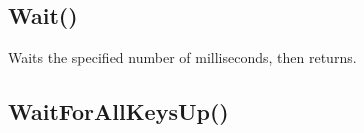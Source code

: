 \documentclass[letterpaper,10pt,english]{sphinxmanual}
\begin{document}
\sphinxAtStartPar
{}

\begin{sphinxVerbatim}[commandchars=\\\{\}]
\end{sphinxVerbatim}

\sphinxAtStartPar
{}

\sphinxAtStartPar
{}

\ignorespaces 

\subsection{Wait()}
\label{\detokenize{reference/peblenvironment:wait}}\label{\detokenize{reference/peblenvironment:index-68}}
\sphinxAtStartPar
{}

\sphinxAtStartPar
Waits the specified number of milliseconds, then returns.

\sphinxAtStartPar
{}

\begin{sphinxVerbatim}[commandchars=\\\{\}]
\end{sphinxVerbatim}

\sphinxAtStartPar
{}

\begin{sphinxVerbatim}[commandchars=\\\{\}]
\end{sphinxVerbatim}

\ignorespaces 

\subsection{WaitForAllKeysUp()}
\label{\detokenize{reference/peblenvironment:waitforallkeysup}}\label{\detokenize{reference/peblenvironment:index-69}}
\sphinxAtStartPar
{}
\end{document}
